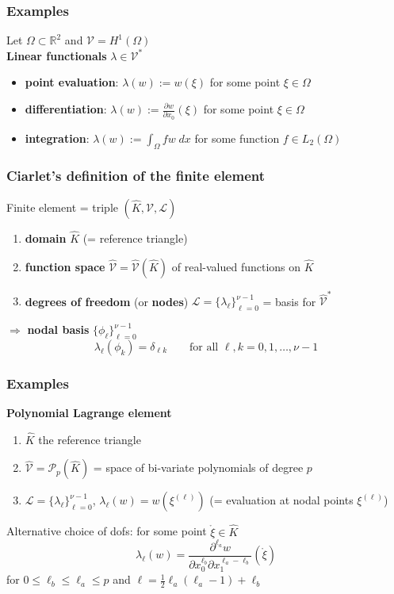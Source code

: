 \documentclass{beamer}
\begin{document}

\begin{frame}
\frametitle{Examples}
Let $\Omega\subset \mathbb{R}^2$ and $\mathcal{V}=H^1(\Omega)$\\[2ex]
\textbf{Linear functionals} $\lambda\in\mathcal{V}^*$
\begin{itemize}
\item \textbf{point evaluation}: $\lambda(w) := w(\xi)$ for some point $\xi\in \Omega$
\item \textbf{differentiation}: $\lambda(w) := \frac{\partial w}{\partial x_0}(\xi)$ for some point $\xi\in \Omega$
\item \textbf{integration}: $\lambda(w) := \int_\Omega fw\;dx$ for some function $f \in L_2(\Omega)$
\end{itemize}
\end{frame}


\begin{frame}
\frametitle{Ciarlet's definition of the finite element}
Finite element = triple $(\widehat{K},\widehat{\mathcal{V}},\mathcal{L})$
\begin{enumerate}
\item \textbf{domain} $\widehat{K}$ (= reference triangle)
\item \textbf{function space} $\widehat{\mathcal{V}}=\widehat{\mathcal{V}}(\widehat{K})$ of real-valued functions on $\widehat{K}$
\item \textbf{degrees of freedom} {\footnotesize(or \textbf{nodes})} $\mathcal{L} = \{\lambda_\ell\}_{\ell=0}^{\nu-1}$ = basis for $\widehat{\mathcal{V}}^*$
\end{enumerate}
\vspace{2ex}
$\Rightarrow$ \textbf{nodal basis} $\{\phi_\ell\}_{\ell=0}^{\nu-1}$
$$
\lambda_\ell (\phi_k) = \delta_{\ell k} \qquad\text{for all $\ell,k=0,1,\dots,\nu-1$}
$$
\end{frame}


\begin{frame}
\frametitle{Examples}
\textbf{Polynomial Lagrange element}
\begin{enumerate}
\item $\widehat{K}$ the reference triangle
\item $\widehat{\mathcal{V}} = \mathcal{P}_p(\widehat{K})$ = space of bi-variate polynomials of degree $p$
\item $\mathcal{L}=\{\lambda_\ell\}_{\ell=0}^{\nu-1}$, $\lambda_\ell(w) = w(\xi^{(\ell)})$ {\footnotesize (= evaluation at nodal points $\xi^{(\ell)}$)}
\end{enumerate}
\vspace{2ex}
Alternative choice of dofs: for some point $\mathring{\xi}\in \widehat{K}$
$$
\lambda_\ell (w) = \frac{\partial^{\ell_a}w}{\partial x_0^{\ell_b} \partial x_1^{\ell_a-\ell_b}}(\mathring{\xi}) 
$$
for $0\le \ell_b \le \ell_a\le p$ and $\ell=\frac{1}{2}\ell_a(\ell_a-1) + \ell_b$
\end{frame}
\end{document}
